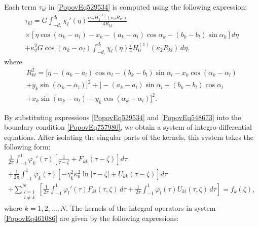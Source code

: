 \noindent Each term \( \tau_{kl} \) in \eqref{PopovEq529534} is computed using the following expression:
\begin{multline} \label{PopovEq548673} 
	\tau_{kl} = G \int_{-d_l}^{d_l} \chi_l'(\eta) \frac{i \kappa_2 H_1^{(1)}(\kappa_2 R_{kl})}{4 R_{kl}} 
	\\
	\times \left[\eta \cos(\alpha_k - \alpha_l) - x_k - (a_k - a_l) \cos \alpha_k - (b_k - b_l) \sin \alpha_k \right] d\eta 
	\\
	+ \kappa_2^2 G \cos(\alpha_k - \alpha_l) \int_{-d_l}^{d_l} \chi_l(\eta) \frac{i}{4} H_0^{(1)}(\kappa_2 R_{kl})\, d\eta,
\end{multline}
where
\begin{multline*}
	R_{kl}^2 = \Big[\eta - (a_k - a_l) \cos \alpha_l - (b_k - b_l) \sin \alpha_l - x_k \cos(\alpha_k - \alpha_l) 
	\\
	+ y_k \sin(\alpha_k - \alpha_l)\Big]^2 
	+ \Big[-(a_k - a_l) \sin \alpha_l + (b_k - b_l) \cos \alpha_l 
	\\
	+ x_k \sin(\alpha_k - \alpha_l) + y_k \cos(\alpha_k - \alpha_l)\Big]^2.
\end{multline*}

By substituting expressions \eqref{PopovEq529534} and \eqref{PopovEq548673} into the boundary condition \eqref{PopovEq757980}, we obtain a system of integro-differential equations. After isolating the singular parts of the kernels, this system takes the following form:
\begin{multline} \label{PopovEq461086} 
	\frac{1}{2\pi} \int_{-1}^{1} \varphi_k'(\tau) \left[ \frac{1}{\tau - \zeta} + F_{kk}(\tau - \zeta) \right] d\tau 
	\\
	+ \frac{1}{2\pi} \int_{-1}^{1} \varphi_k(\tau) \left[ -\gamma_k^2 \kappa_0^2 \ln |\tau - \zeta| + U_{kk}(\tau - \zeta) \right] d\tau 
	\\
	+ \sum_{\substack{l=1 \\ l \ne k}}^{N} \left[ \frac{1}{2\pi} \int_{-1}^{1} \varphi_l'(\tau) F_{kl}(\tau, \zeta)\, d\tau + \frac{1}{2\pi} \int_{-1}^{1} \varphi_l(\tau) U_{kl}(\tau, \zeta)\, d\tau \right] = f_k(\zeta),
\end{multline}
where \( k = 1, 2, \dots, N \). The kernels of the integral operators in system \eqref{PopovEq461086} are given by the following expressions:

